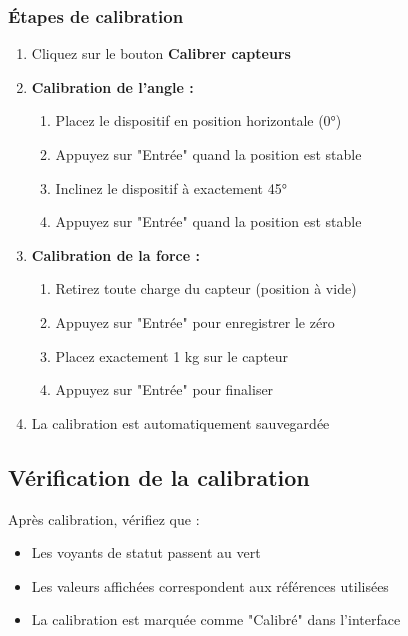 \documentclass[12pt,a4paper]{article}
\begin{document}
\subsubsection{Étapes de calibration}

\begin{enumerate}
    \item Cliquez sur le bouton \textbf{Calibrer capteurs}
    
    \item \textbf{Calibration de l'angle :}
    \begin{enumerate}
        \item Placez le dispositif en position horizontale (0°)
        
        \item Appuyez sur "Entrée" quand la position est stable
        \item Inclinez le dispositif à exactement 45°
        
        \item Appuyez sur "Entrée" quand la position est stable
    \end{enumerate}
    
    \item \textbf{Calibration de la force :}
    \begin{enumerate}
        \item Retirez toute charge du capteur (position à vide)
        
        \item Appuyez sur "Entrée" pour enregistrer le zéro
        \item Placez exactement 1 kg sur le capteur
        
        \item Appuyez sur "Entrée" pour finaliser
    \end{enumerate}
    
    \item La calibration est automatiquement sauvegardée
\end{enumerate}

\subsection{Vérification de la calibration}

Après calibration, vérifiez que :
\begin{itemize}
    \item Les voyants de statut passent au vert
    \item Les valeurs affichées correspondent aux références utilisées
    \item La calibration est marquée comme "Calibré" dans l'interface
\end{itemize}
\end{document}
